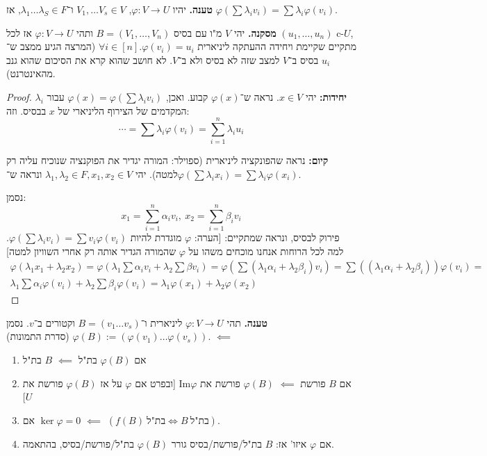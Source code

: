 \documentclass[]{article}
\newcommand\Img   {\mathrm{Im}}
\newcommand\co        {\colon}
\newcommand\ag        {\alpha}
\newcommand\bg        {\beta}
\newcommand\cl [1]    {\left ( #1 \right )}
\renewcommand\phi     {\varphi}
\begin{document}
	\textbf{טענה. }יהיו $\phi \co V \to U$, $V_1, \dots V_s \in V$ ו־$\lambda_1 \dots \lambda_S\in F$, אז $\phi\cl{\sum\lambda_iv_i} = \sum \lambda_i\phi(v_i)$. 
	
	\textbf{מסקנה. }יהי $V$ מ"ו עם בסיס $B =(V_1, \dots, V_n)$ ותהי $\phi \co V \to U$ אז לכל $(u_1, \dots, u_n)$ c-$U$, מתקיים שקיימת ויחידה ההעתקה ליניארית $\forall i \in [n]. \phi(v_i) = u_i$ (המרצה הגיע ממצב ש־$u_i$ בסיס ב־$V$ למצב שזה לא בסיס ולא ב־$V$. לא חושב שהוא קרא את הסיכום שהוא גנב מהאינטרנט). 
	
	\begin{proof}
		\textbf{יחידות: }יהי $x \in V$. נראה ש־$\phi(x)$ קבוע. ואכן, $\phi(x) = \phi\cl{\sum\lambda_iv_i}$ עבור $\lambda_i$ המקדמים של הצירוף הליניארי של $x$ בבסיס. וזה: 
		\[ \cdots = \sum\lambda_i\phi(v_i) = \sum_{i = 1}^{n}\lambda_iu_i \]
		
		\textbf{קיום: }נראה שהפונקציה ליניארית (ספוילר: המורה יגדיר את הפוקנציה שנוכיח עליה רק למטה). יהי $\lambda_1, \lambda_2 \in F, x_1, x_2 \in V$ ונראה ש־$\phi(\sum\lambda_ix_i) = \sum\lambda_i\phi(x_i)$. 
		
		נסמן: 
		\[ x_1 = \sum_{i = 1}^{n}\alpha_iv_i, \ x_2 = \sum_{i = 1}^{n}\bg_iv_i \]
		פירוק לבסיס, ונראה שמתקיים: 
		[הערה: $\phi$ מוגדרת להיות $\phi\cl{\sum\lambda_iv_i} = \sum v_i\phi(v_i)$. למה לכל הרוחות אנחנו מוכחים משהו על $\phi$ שהמורה הגדיר אותה רק אחרי השוויון למטה]
		\begin{multline*}
			\phi(\lambda_1x_1 + \lambda_2x_2) = \phi\cl{\lambda_1 \sum \alpha_iv_i + \lambda_2 \sum \bg v_i} = \phi\cl{\sum(\lambda_1\ag_i + \lambda_2\bg_i)v_i} = \sum \cl{(\lambda_1\ag_i + \lambda_2\bg_i)}\phi(v_i) = \\ \lambda_1\sum\ag_i\phi(v_i) + \lambda_2\sum\bg_i\phi(v_i) = \lambda_1 \phi(x_1) + \lambda_2\phi(x_2)
		\end{multline*}
	\end{proof}
	
	\textbf{טענה. }תהי $\phi\co V \to U$ ליניארית ו־$B = (v_1 \dots v_s)$ וקטורים ב־$v$. נסמן $\phi(B) := (\phi(v_1) \dots \phi(v_s))$ (סדרת התמונות). $\impliedby$
	\begin{enumerate}
		\item אם $\phi(B)$ בת"ל $\impliedby$ $B$ בת"ל
		\item אם $B$ פורשת $\impliedby$ $\phi(B)$ פורשת את $\Img\phi$ [ובפרט אם $\phi$ על אז $\phi(B)$ פורשת את $U$]
		\item אם $\ker\phi = 0$ $\impliedby$ $\cl{f(B) \ \text{בת"ל} \iff B \ \text{בת"ל}}$. 
		\item אם $\phi$ איזו' אז: $B$ בת"ל/פורשת/בסיס גורר $\phi(B)$ בת"ל/פורשת/בסיס, בהתאמה. 
	\end{enumerate}
	
\end{document}

